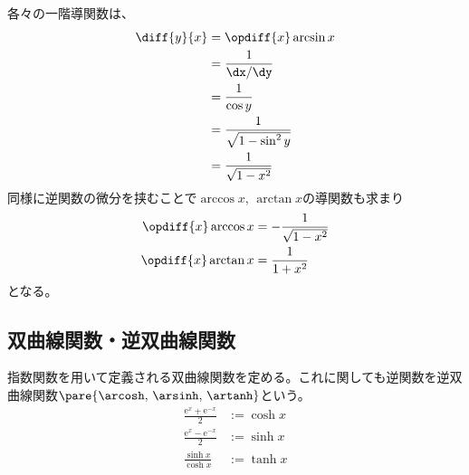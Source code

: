 各々の一階導関数は、
\begin{align}
    \begin{aligned}
        \diff{y}{x} & =\opdiff{x}\arcsin x        \\
                    & =\frac{1}{\dx/\dy}          \\
                    & =\frac{1}{\cos y}           \\
                    & =\frac{1}{\sqrt{1-\sin^2y}} \\
                    & =\frac{1}{\sqrt{1-x^2}}
    \end{aligned}
\end{align}
同様に逆関数の微分を挟むことで$\arccos x,\,\arctan x$の導関数も求まり
\begin{align}
    \opdiff{x}\arccos x & =-\frac{1}{\sqrt{1-x^2}} \\
    \opdiff{x}\arctan x & =\frac{1}{1+x^2}
\end{align}
となる。
\subsection{双曲線関数・逆双曲線関数}
指数関数を用いて定義される双曲線関数を定める。これに関しても逆関数を逆双曲線関数$\pare{\arcosh,\,\arsinh,\,\artanh}$という。
\begin{align}
    \frac{\mathrm{e}^x+\mathrm{e}^{-x}}{2} & :=\cosh x \\
    \frac{\mathrm{e}^x-\mathrm{e}^{-x}}{2} & :=\sinh x \\
    \frac{\sinh x}{\cosh x}                & :=\tanh x 
\end{align}